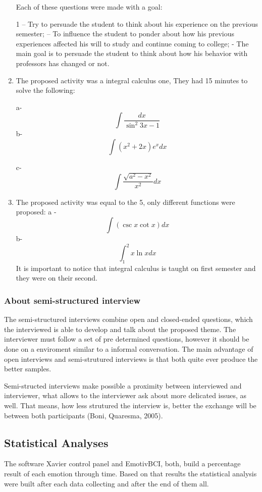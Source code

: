 \documentclass[12pt,openright,a4paper]{article}
\begin{document}
\begin{enumerate}
  Each of these questions were made with a goal:
  
  1 – Try to persuade the student to think about his experience on the previous semester; – To influence the student to ponder about how his previous experiences affected his will to study and continue coming to college; -  The main goal is to persuade the student to think about how his behavior with professors has changed or not.\newline
  
  \item The proposed activity was a integral calculus one, They had 15 minutes to solve the following:\newline
  
  		a- \[ \int\dfrac{dx}{\sin^2{3x - 1}} \]\newline
  		b- \[ \int (x^2 + 2x)e^x dx \]
  		
  		c- \[ \int \dfrac{\sqrt{a^2 - x^2}}{x^2}dx \]
  		
   \item The proposed activity was equal to the 5, only different functions were proposed:\newline
        a - \[ \int (\csc x  \cot x) dx  \] 
        b- \[ \int_{1}^{2} x \ln x dx \]
  It is important to notice that integral calculus is taught on first semester and they were on their second.
 \end{enumerate}
  \subsubsection{About semi-structured interview}
 The semi-structured interviews combine open and closed-ended questions, which the interviewed is able to develop and talk about the proposed theme. The interviewer must follow a set of pre determined questions, however it should be done on a enviroment similar to a informal conversation. The main advantage of open interviews and semi-strutured interviews is that both quite ever produce the better samples.
 
 Semi-structed interviews make possible a proximity between interviewed and interviewer, what  allows to the interviewer ask about more delicated issues, as well. That means, how less strutured the interview is, better the exchange will be between both participants (Boni, Quaresma, 2005).
 
 \subsection{Statistical Analyses}
 The software Xavier control panel and EmotivBCI, both, build a percentage result of each emotion through time. Based on that results the statistical analysis were built after each data collecting and after the end of them all.
 
\end{document}
